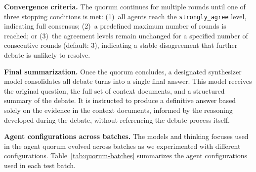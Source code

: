 \textbf{Convergence criteria.} The quorum continues for multiple rounds until one of three stopping conditions is met: (1)~all agents reach the \texttt{strongly\_agree} level, indicating full consensus; (2)~a predefined maximum number of rounds is reached; or (3)~the agreement levels remain unchanged for a specified number of consecutive rounds (default: 3), indicating a stable disagreement that further debate is unlikely to resolve.

\textbf{Final summarization.} Once the quorum concludes, a designated synthesizer model consolidates all debate turns into a single final answer. This model receives the original question, the full set of context documents, and a structured summary of the debate. It is instructed to produce a definitive answer based solely on the evidence in the context documents, informed by the reasoning developed during the debate, without referencing the debate process itself.

\textbf{Agent configurations across batches.} The models and thinking focuses used in the agent quorum evolved across batches as we experimented with different configurations. Table~\ref{tab:quorum-batches} summarizes the agent configurations used in each test batch.

